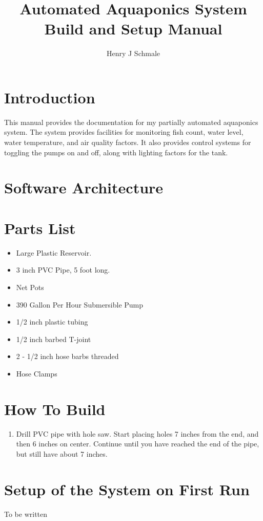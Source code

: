 \documentclass[american,man,12pt]{apa6}
\title{Automated Aquaponics System Build and Setup Manual}
\author{Henry J Schmale}
\affiliation{Harrisburg University of Science and Technology}
\begin{document}
\maketitle
\tableofcontents

\section{Introduction}
This manual provides the documentation for my partially automated aquaponics
system. The system provides facilities for monitoring fish count, water level,
water temperature, and air quality factors. It also provides control systems
for toggling the pumps on and off, along with lighting factors for the tank.

\section{Software Architecture}



\section{Parts List}
\begin{itemize}
	\item Large Plastic Reservoir.
	\item 3 inch PVC Pipe, 5 foot long.
	\item Net Pots
	\item 390 Gallon Per Hour Submersible Pump
	\item 1/2 inch plastic tubing
    \item 1/2 inch barbed T-joint
    \item 2 - 1/2 inch hose barbs threaded
    \item Hose Clamps
\end{itemize}


\section{How To Build}
\begin{enumerate}
	\item Drill PVC pipe with hole saw. Start placing holes 7 inches from the
		  end, and then 6 inches on center. Continue until you have reached
		  the end of the pipe, but still have about 7 inches.
\end{enumerate}


\section{Setup of the System on First Run}
To be written
\end{document}
